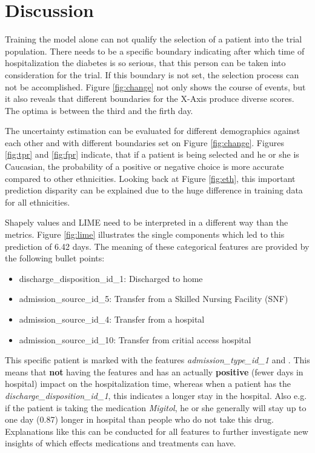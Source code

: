 \documentclass[journal]{IEEEtran}
\begin{document}
%
%
\section{Discussion}
Training the model alone can not qualify the selection of a patient into the trial population. There needs to be a specific boundary indicating after which time of hospitalization the diabetes is so serious, that this person can be taken into consideration for the trial. If this boundary is not set, the selection process can not be accomplished. Figure \ref{fig:change} not only shows the course of events, but it also reveals that different boundaries for the X-Axis produce diverse scores. The optima is between the third and the firth day. 

The uncertainty estimation can be evaluated for different demographics against each other and with different boundaries set on Figure \ref{fig:change}. Figures \ref{fig:tpr} and \ref{fig:fpr} indicate, that if a patient is being selected and he or she is Caucasian, the probability of a positive or negative choice is more accurate compared to other ethnicities. Looking back at Figure \ref{fig:eth}, this important prediction disparity can be explained due to the huge difference in training data for all ethnicities.

Shapely values and LIME need to be interpreted in a different way than the metrics. Figure \ref{fig:lime} illustrates the single components which led to this prediction of 6.42 days. The meaning of these categorical features are provided by the following bullet points: \\

\begin{itemize}
	\item discharge\_disposition\_id\_1: Discharged to home
	\item admission\_source\_id\_5: Transfer from a Skilled Nursing Facility (SNF)
	\item admission\_source\_id\_4: Transfer from a hospital
	\item admission\_source\_id\_10: Transfer from critial access hospital \\
\end{itemize}

This specific patient is marked with the features \textit{admission\_type\_id\_1} and . This means that \textbf{not} having the features  and  has an actually \textbf{positive} (fewer days in hospital) impact on the hospitalization time, whereas when a patient has the \textit{discharge\_disposition\_id\_1}, this indicates a longer stay in the hospital. Also e.g. if the patient is taking the medication \textit{Migitol}, he or she generally will stay up to one day (0.87) longer in hospital than people who do not take this drug. Explanations like this can be conducted for all features to further investigate new insights of which effects medications and treatments can have.
\end{document}
